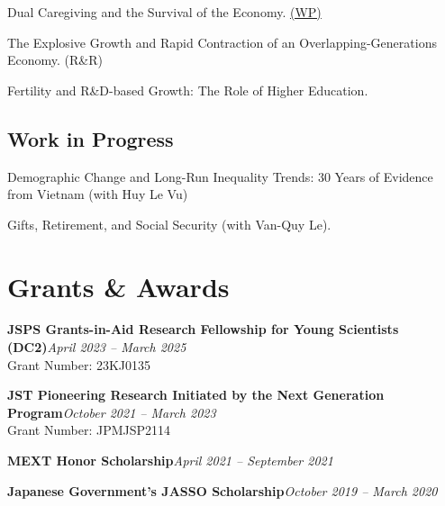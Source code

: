 \documentclass[12pt]{article}
\begin{document}
\begin{enumerate}[label={[\arabic*]}]

\item Dual Caregiving and the Survival of the Economy. \href{https://ideas.repec.org/p/toh/tupdaa/64.html}{(WP)}

\item The Explosive Growth and Rapid Contraction of an Overlapping-Generations Economy. (R\&R)

\item Fertility and R\&D-based Growth: The Role of Higher Education.

\end{enumerate}

\subsection{Work in Progress}

\begin{enumerate}[label={[\arabic*]}]

\item Demographic Change and Long-Run Inequality Trends: 30 Years of Evidence from Vietnam (with Huy Le Vu)

\item Gifts, Retirement, and Social Security (with Van-Quy Le).

\end{enumerate}


\section{Grants \& Awards}

\textbf{JSPS Grants-in-Aid Research Fellowship for Young Scientists (DC2)}\hfill \emph{April 2023 -- March 2025}\\
Grant Number: 23KJ0135

\textbf{JST Pioneering Research Initiated by the Next Generation Program}\hfill \emph{October 2021 -- March 2023}\\
Grant Number: JPMJSP2114

\textbf{MEXT Honor Scholarship}\hfill \emph{April 2021 -- September 2021}

\textbf{Japanese Government's JASSO Scholarship}\hfill \emph{October 2019 -- March 2020}
\end{document}
